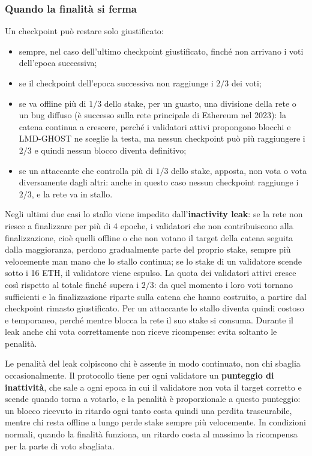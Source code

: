 \documentclass[a4paper, 11pt, oneside]{book}
\begin{document}
	\subsubsection{Quando la finalità si ferma}
	Un checkpoint può restare solo giustificato:
	\begin{itemize}
		\item sempre, nel caso dell'ultimo checkpoint giustificato, finché non arrivano i
			voti dell'epoca successiva;
		\item se il checkpoint dell'epoca successiva non raggiunge i $2/3$ dei voti;
		\item se va offline più di $1/3$ dello stake, per un guasto, una divisione della
			rete o un bug diffuso (è successo sulla rete principale di Ethereum nel 2023):
			la catena continua a crescere, perché i validatori attivi propongono blocchi e
			LMD-GHOST ne sceglie la testa, ma nessun checkpoint può più raggiungere i
			$2/3$ e quindi nessun blocco diventa definitivo;
		\item se un attaccante che controlla più di $1/3$ dello stake, apposta, non vota o
			vota diversamente dagli altri: anche in questo caso nessun checkpoint
			raggiunge i $2/3$, e la rete va in stallo.
	\end{itemize}

	Negli ultimi due casi lo stallo viene impedito dall'\textbf{inactivity leak}: se la
	rete non riesce a finalizzare per più di 4 epoche, i validatori che non
	contribuiscono alla finalizzazione, cioè quelli offline o che non votano il target
	della catena seguita dalla maggioranza, perdono gradualmente parte del proprio
	stake, sempre più velocemente man mano che lo stallo continua; se lo stake di un
	validatore scende sotto i 16 ETH, il validatore viene espulso. La quota dei
	validatori attivi cresce così rispetto al totale finché supera i $2/3$: da quel
	momento i loro voti tornano sufficienti e la finalizzazione riparte sulla catena che
	hanno costruito, a partire dal checkpoint rimasto giustificato. Per un attaccante lo
	stallo diventa quindi costoso e temporaneo, perché mentre blocca la rete il suo stake
	si consuma. Durante il leak anche chi vota correttamente non riceve ricompense:
	evita soltanto le penalità.

	Le penalità del leak colpiscono chi è assente in modo continuato, non chi sbaglia
	occasionalmente. Il protocollo tiene per ogni validatore un \textbf{punteggio di
	inattività}, che sale a ogni epoca in cui il validatore non vota il target corretto e
	scende quando torna a votarlo, e la penalità è proporzionale a questo punteggio: un
	blocco ricevuto in ritardo ogni tanto costa quindi una perdita trascurabile, mentre
	chi resta offline a lungo perde stake sempre più velocemente. In condizioni normali,
	quando la finalità funziona, un ritardo costa al massimo la ricompensa per la parte
	di voto sbagliata.
\end{document}

